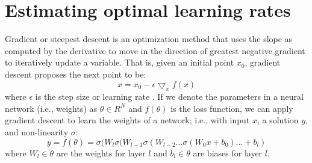 \documentclass{article}
\begin{document}

	\section{Estimating optimal learning rates}

Gradient or steepest descent is an optimization method that uses the slope as computed by the derivative to move in the direction of greatest negative gradient to iteratively update a variable.  
That is, given an initial point $x_0$, gradient descent proposes the next point to be:
\begin{equation}
x = x_0 - \epsilon \bigtriangledown_x f(x)
\label{eqn:LR}
\end{equation}
where $\epsilon$ is the step size or learning rate .  If we denote the parameters in a neural network (i.e., weights) as $ \theta \in R^N $ and $f(\theta)$ is the loss function, we can apply gradient descent to learn the weights of a network; i.e., with input $x$, a solution $y$, and non-linearity $\sigma$: 
\begin{equation}
y = f(\theta) = \sigma ( W_l \sigma  ( W_{l-1} \sigma ( W_{l-2} ... \sigma ( W_0 x + b_0) ... + b_l)
\end{equation}
where $W_l \in \theta$ are the weights for layer $l$ and $b_l \in \theta$ are biases for layer $l$.
\end{document}
